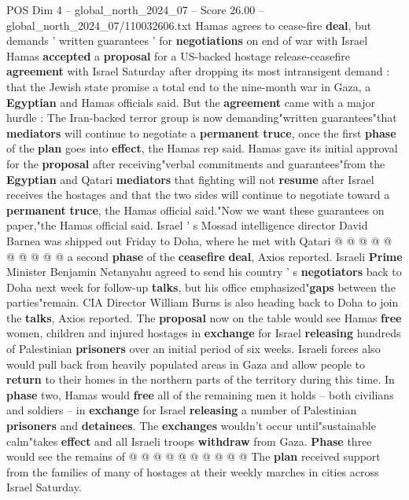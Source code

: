 \begin{textsample}{POS Dim 4 – global\_north\_2024\_07 – Score 26.00 – global\_north\_2024\_07/110032606.txt}  \label{ex:f4_pos_174}
Hamas agrees to cease-fire \textbf{deal}, but demands ' written guarantees ' for \textbf{negotiations} on end of war with Israel Hamas \textbf{accepted} a \textbf{proposal} for a US-backed hostage release-ceasefire \textbf{agreement} with Israel Saturday after dropping its most intransigent demand : that the Jewish state promise a total end to the nine-month war in Gaza, a \textbf{Egyptian} and Hamas officials said.
But the \textbf{agreement} came with a major hurdle : The Iran-backed terror group is now demanding"written guarantees"that \textbf{mediators} will continue to negotiate a \textbf{permanent} \textbf{truce}, once the first \textbf{phase} of the \textbf{plan} goes into \textbf{effect}, the Hamas rep said.
Hamas gave its initial approval for the \textbf{proposal} after receiving"verbal commitments and guarantees"from the \textbf{Egyptian} and Qatari \textbf{mediators} that fighting will not \textbf{resume} after Israel receives the hostages and that the two sides will continue to negotiate toward a \textbf{permanent} \textbf{truce}, the Hamas official said."Now we want these guarantees on paper,"the Hamas official said.
Israel ' s Mossad intelligence director David Barnea was shipped out Friday to Doha, where he met with Qatari @ @ @ @ @ @ @ @ @ @ a second \textbf{phase} of the \textbf{ceasefire} \textbf{deal}, Axios reported.
Israeli \textbf{Prime} Minister Benjamin Netanyahu agreed to send his country ' s \textbf{negotiators} back to Doha next week for follow-up \textbf{talks}, but his office emphasized"\textbf{gaps} between the parties"remain.
CIA Director William Burns is also heading back to Doha to join the \textbf{talks}, Axios reported.
The \textbf{proposal} now on the table would see Hamas \textbf{free} women, children and injured hostages in \textbf{exchange} for Israel \textbf{releasing} hundreds of Palestinian \textbf{prisoners} over an initial period of six weeks.
Israeli forces also would pull back from heavily populated areas in Gaza and allow people to \textbf{return} to their homes in the northern parts of the territory during this time.
In \textbf{phase} two, Hamas would \textbf{free} all of the remaining men it holds -- both civilians and soldiers -- in \textbf{exchange} for Israel \textbf{releasing} a number of Palestinian \textbf{prisoners} and \textbf{detainees}.
The \textbf{exchanges} wouldn't occur until"sustainable calm"takes \textbf{effect} and all Israeli troops \textbf{withdraw} from Gaza. \textbf{Phase} three would see the remains of @ @ @ @ @ @ @ @ @ @ The \textbf{plan} received support from the families of many of hostages at their weekly marches in cities across Israel Saturday.

\end{textsample}
